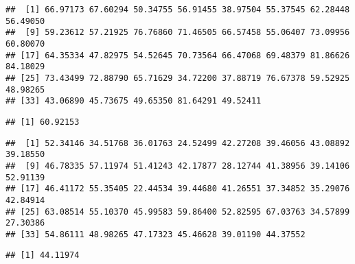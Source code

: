 \documentclass[
]{article}
\newenvironment{Shaded}{\begin{snugshade}}{\end{snugshade}}
\newcommand{\FunctionTok}[1]{\textcolor[rgb]{0.13,0.29,0.53}{\textbf{#1}}}
\newcommand{\NormalTok}[1]{#1}
\newcommand{\SpecialCharTok}[1]{\textcolor[rgb]{0.81,0.36,0.00}{\textbf{#1}}}
\begin{document}
\begin{verbatim}
##  [1] 66.97173 67.60294 50.34755 56.91455 38.97504 55.37545 62.28448 56.49050
##  [9] 59.23612 57.21925 76.76860 71.46505 66.57458 55.06407 73.09956 60.80070
## [17] 64.35334 47.82975 54.52645 70.73564 66.47068 69.48379 81.86626 84.18029
## [25] 73.43499 72.88790 65.71629 34.72200 37.88719 76.67378 59.52925 48.98265
## [33] 43.06890 45.73675 49.65350 81.64291 49.52411
\end{verbatim}

\begin{Shaded}
\end{Shaded}

\begin{verbatim}
## [1] 60.92153
\end{verbatim}

\begin{Shaded}
\end{Shaded}

\begin{verbatim}
##  [1] 52.34146 34.51768 36.01763 24.52499 42.27208 39.46056 43.08892 39.18550
##  [9] 46.78335 57.11974 51.41243 42.17877 28.12744 41.38956 39.14106 52.91139
## [17] 46.41172 55.35405 22.44534 39.44680 41.26551 37.34852 35.29076 42.84914
## [25] 63.08514 55.10370 45.99583 59.86400 52.82595 67.03763 34.57899 27.30386
## [33] 54.86111 48.98265 47.17323 45.46628 39.01190 44.37552
\end{verbatim}

\begin{Shaded}
\end{Shaded}

\begin{verbatim}
## [1] 44.11974
\end{verbatim}
\end{document}
